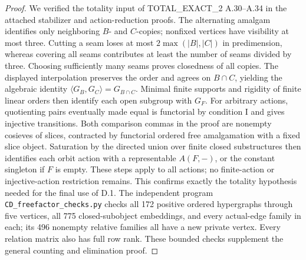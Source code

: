 \begin{proof}
We verified the totality input of TOTAL\_EXACT\_2 A.30--A.34
in the attached stabilizer and action-reduction proofs. The
alternating amalgam identifies only neighboring $B$- and $C$-copies;
nonfixed vertices have visibility at most three. Cutting a
seam loses at most $2\max(|B|,|C|)$ in predimension, whereas
covering all seams contributes at least the number of seams
divided by three. Choosing sufficiently many seams proves
closedness of all copies. The displayed interpolation preserves
the order and agrees on $B\cap C$, yielding the algebraic identity
$\langle G_B,G_C\rangle=G_{B\cap C}$. Minimal finite supports
and rigidity of finite linear orders then identify each open
subgroup with $G_F$.
For arbitrary actions, quotienting pairs eventually made equal
is functorial by condition I and gives injective transitions.
Both comparison commas in the proof are nonempty cosieves of
slices, contracted by functorial ordered free amalgamation with
a fixed slice object. Saturation by the directed union over
finite closed substructures then identifies each orbit action
with a representable $A(F,-)$, or the constant singleton if
$F$ is empty. These steps apply to all actions; no finite-action
or injective-action restriction remains. This confirms exactly
the totality hypothesis needed for the final use of D.1.
The independent program \texttt{CD\_freefactor\_checks.py}
checks all 172 positive ordered hypergraphs through five vertices,
all 775 closed-subobject embeddings, and every actual-edge family
in each; its 496 nonempty relative families all have a new private
vertex. Every relation matrix also has full row rank. These bounded
checks supplement the general counting and elimination proof.
\end{proof}

